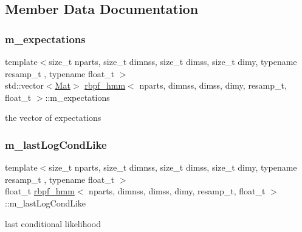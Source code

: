 \subsection{Member Data Documentation}
\mbox{\label{classrbpf__hmm_aedb1b513e10d071735fb5d06295c664b}} 
\subsubsection{\texorpdfstring{m\+\_\+expectations}{m\_expectations}}
{\footnotesize\ttfamily template$<$size\+\_\+t nparts, size\+\_\+t dimnss, size\+\_\+t dimss, size\+\_\+t dimy, typename resamp\+\_\+t , typename float\+\_\+t $>$ \\
std\+::vector$<$\hyperlink{classrbpf__hmm_ac32aaf9833767d6886f732243a77aa66}{Mat}$>$ \hyperlink{classrbpf__hmm}{rbpf\+\_\+hmm}$<$ nparts, dimnss, dimss, dimy, resamp\+\_\+t, float\+\_\+t $>$\+::m\+\_\+expectations\hspace{0.3cm}{\ttfamily [private]}}

the vector of expectations \mbox{\label{classrbpf__hmm_a8b08a5af7f7ef6b0079c69ff0c6b485f}} 
\subsubsection{\texorpdfstring{m\+\_\+last\+Log\+Cond\+Like}{m\_lastLogCondLike}}
{\footnotesize\ttfamily template$<$size\+\_\+t nparts, size\+\_\+t dimnss, size\+\_\+t dimss, size\+\_\+t dimy, typename resamp\+\_\+t , typename float\+\_\+t $>$ \\
float\+\_\+t \hyperlink{classrbpf__hmm}{rbpf\+\_\+hmm}$<$ nparts, dimnss, dimss, dimy, resamp\+\_\+t, float\+\_\+t $>$\+::m\+\_\+last\+Log\+Cond\+Like\hspace{0.3cm}{\ttfamily [private]}}

last conditional likelihood \mbox{\label{classrbpf__hmm_a6dc40d4e2fd23ce66be5473bdaf438a5}} 
